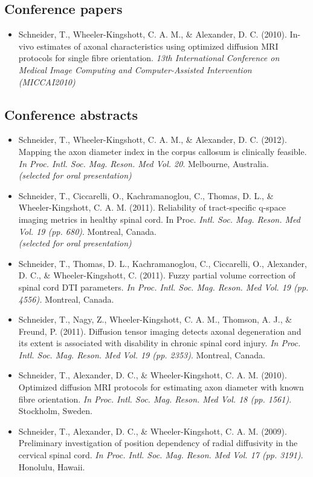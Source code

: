 \subsection*{Conference papers}
\begin{itemize}
 \item Schneider, T., Wheeler-Kingshott, C. A. M., \& Alexander, D. C. (2010). In-vivo estimates of axonal characteristics using optimized diffusion MRI protocols for single fibre orientation. \emph{13th International Conference on Medical Image Computing and Computer-Assisted Intervention (MICCAI2010)}  
\end{itemize}
\subsection*{Conference abstracts}
\begin{itemize}
\item Schneider, T., Wheeler-Kingshott, C. A. M., \& Alexander, D. C. (2012). Mapping the axon diameter index in the corpus callosum is clinically feasible.\emph{ In Proc. Intl. Soc. Mag. Reson. Med Vol. 20}. Melbourne, Australia.\\ \emph{(selected for oral presentation)}
\item Schneider, T., Ciccarelli, O., Kachramanoglou, C., Thomas, D. L., \& Wheeler-Kingshott, C. A. M. (2011). Reliability of tract-specific q-space imaging metrics in healthy spinal cord. In Proc. \emph{Intl. Soc. Mag. Reson. Med Vol. 19 (pp. 680)}. Montreal, Canada.\\
\emph{(selected for oral presentation)}
\item Schneider, T., Thomas, D. L., Kachramanoglou, C., Ciccarelli, O., Alexander, D. C., \& Wheeler-Kingshott, C. (2011). Fuzzy partial volume correction of spinal cord DTI parameters. \emph{In Proc. Intl. Soc. Mag. Reson. Med Vol. 19 (pp. 4556).} Montreal, Canada.
\item	Schneider, T., Nagy, Z., Wheeler-Kingshott, C. A. M., Thomson, A. J., \& Freund, P. (2011). Diffusion tensor imaging detects axonal degeneration and its extent is associated with disability in chronic spinal cord injury. \emph{In Proc. Intl. Soc. Mag. Reson. Med Vol. 19 (pp. 2353)}. Montreal, Canada.
\item	Schneider, T., Alexander, D. C., \& Wheeler-Kingshott, C. A. M. (2010). Optimized diffusion MRI protocols for estimating axon diameter with known fibre orientation. \emph{In Proc. Intl. Soc. Mag. Reson. Med Vol. 18 (pp. 1561)}. Stockholm, Sweden.
\item	Schneider, T., Alexander, D. C., \& Wheeler-Kingshott, C. A. M. (2009). Preliminary investigation of position dependency of radial diffusivity in the cervical spinal cord. \emph{In Proc. Intl. Soc. Mag. Reson. Med Vol. 17 (pp. 3191)}. Honolulu, Hawaii.
\end{itemize}

